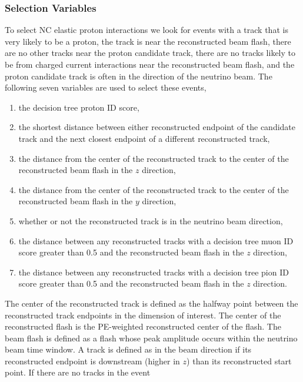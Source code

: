   \subsubsection{Selection Variables}\label{sec:selectionvars}
    To select NC elastic proton interactions we look for events with a track
    that is very likely to be a proton, the track is near the reconstructed
    beam flash, there are no other tracks near the proton candidate track,
    there are no tracks likely to be from charged current interactions near the
    reconstructed beam flash, and the proton candidate track is often in the
    direction of the neutrino beam. The following seven variables are used to
    select these events,
    \begin{enumerate}
      \item the decision tree proton ID score,
      \item the shortest distance between either reconstructed endpoint of the
      candidate track and the next closest endpoint of a different
      reconstructed track,
      \item the distance from the center of the reconstructed track to the
      center of the reconstructed beam flash in the $z$ direction,
      \item the distance from the center of the reconstructed track to the
      center of the reconstructed beam flash in the $y$ direction,
      \item whether or not the reconstructed track is in the neutrino beam
      direction,
      \item the distance between any reconstructed tracks with a decision tree
      muon ID score greater than 0.5 and the reconstructed beam flash in the
      $z$ direction,
      \item the distance between any reconstructed tracks with a decision tree
      pion ID score greater than 0.5 and the reconstructed beam flash in the
      $z$ direction.
    \end{enumerate}
    The center of the reconstructed track is defined as the halfway point
    between the reconstructed track endpoints in the dimension of interest. The
    center of the reconstructed flash is the PE-weighted reconstructed center
    of the flash. The beam flash is defined as a flash whose peak amplitude
    occurs within the neutrino beam time window. A track is defined as in the
    beam direction if its reconstructed endpoint is downstream (higher in $z$)
    than its reconstructed start point. If there are no tracks in the event
